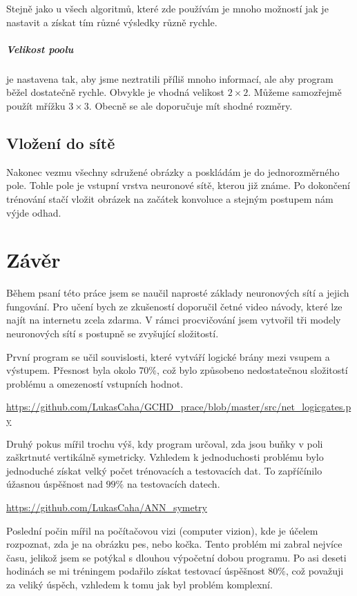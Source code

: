 \documentclass[12pt,a4paper]{report}
\begin{document}
		Stejně jako u všech algoritmů, které zde používám je mnoho možností jak je nastavit a získat tím různé výsledky různě rychle.
		\paragraph{Velikost poolu}
		je nastavena tak, aby jsme neztratili příliš mnoho informací, ale aby program běžel dostatečně rychle. Obvykle je vhodná velikost $2\times2$. Můžeme samozřejmě použít mřížku $3\times3$. Obecně se ale doporučuje mít shodné rozměry.
	\section{Vložení do sítě}
		Nakonec vezmu všechny sdružené obrázky a poskládám je do jednorozměrného pole. Tohle pole je vstupní vrstva neuronové sítě, kterou již známe. Po dokončení trénování stačí vložit obrázek na začátek konvoluce a stejným postupem nám výjde odhad.
		
\chapter{Závěr}
Během psaní této práce jsem se naučil naprosté základy neuronových sítí a jejich fungování. Pro učení bych ze zkušeností doporučil četné video návody, které lze najít na internetu zcela zdarma. V rámci procvičování jsem vytvořil tři modely neuronových sítí s postupně se zvyšující složitostí.

První program se učil souvislosti, které vytváří logické brány mezi vsupem a výstupem. Přesnost byla okolo $70\%$, což bylo způsobeno nedostatečnou složitostí problému a omezeností vstupních hodnot. 

\url{https://github.com/LukasCaha/GCHD_prace/blob/master/src/net_logicgates.py}

Druhý pokus mířil trochu výš, kdy program určoval, zda jsou buňky v poli zaškrtnuté vertikálně symetricky. Vzhledem k jednoduchosti problému bylo jednoduché získat velký počet trénovacích a testovacích dat. To zapříčínilo úžasnou úspěšnost nad $99\%$ na testovacích datech. 

\url{https://github.com/LukasCaha/ANN_symetry}

Poslední počin mířil na počítačovou vizi (computer vizion), kde je účelem rozpoznat, zda je na obrázku pes, nebo kočka. Tento problém mi zabral nejvíce času, jelikož jsem se potýkal s dlouhou výpočetní dobou programu. Po asi deseti hodinách se mi tréningem podařilo získat testovací úspěšnost $80\%$, což považuji za veliký úspěch, vzhledem k tomu jak byl problém komplexní. 
\end{document}
